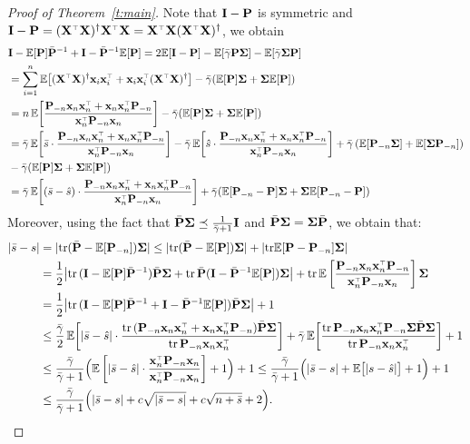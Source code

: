 \documentclass[11pt]{article}
\begin{document}
\begin{proof}[Proof of Theorem~\ref{t:main}]
Note that $\mathbf I - \mathbf P$ is symmetric and $\I-\P=(\X^\top\X)^\dagger\X^\top\X = \X^\top\X (\X^\top\X)^\dagger$, we obtain
\begin{align*}
  &\I - \E[\P]\bar\P^{-1} + \I - \bar\P^{-1} \E[\P]
  = 2\E[\I -\P] - \E[\bar\gamma\P\Sigmab] - \E[\bar\gamma\Sigmab\P]\\
  &= \sum_{i=1}^n\E\big[(\X^\top\X)^\dagger\x_i\x_i^\top + \x_i\x_i^\top (\X^\top\X)^\dagger \big] - \bar\gamma (\E[\P]\Sigmab + \Sigmab \E[\P])\\
  &=n\,\E\bigg[\frac{\P_{-n}\x_n\x_n^\top + \x_n\x_n^\top \P_{-n}}{\x_n^\top\P_{-n}\x_n}\bigg] - \bar\gamma (\E[\P]\Sigmab + \Sigmab \E[\P])\\
  &=\bar\gamma\,
    \E\bigg[\bar s\cdot\frac{\P_{-n}\x_n\x_n^\top + \x_n\x_n^\top \P_{-n}} {\x_n^\top\P_{-n}\x_n}\bigg]
    -\bar\gamma\,\E\bigg[\hat s
    \cdot\frac{\P_{-n}\x_n\x_n^\top + \x_n\x_n^\top \P_{-n}}{\x_n^\top\P_{-n}\x_n}\bigg] +
    \bar\gamma\,(\E[\P_{-n}\Sigmab] + \E[\Sigmab\P_{-n}]) \\ 
  &- \bar\gamma (\E[\P]\Sigmab + \Sigmab \E[\P]) \\
  &=\bar\gamma\,\E\bigg[(\bar s - \hat s)
    \cdot\frac{\P_{-n}\x_n\x_n^\top + \x_n\x_n^\top \P_{-n}}{\x_n^\top\P_{-n}\x_n}\bigg]
+    \bar\gamma (\E[\P_{-n}-\P]\Sigmab + \Sigmab \E[\P_{-n}-\P])
\end{align*}
Moreover, using the fact that $\bar{\mathbf P}\mathbf{\Sigma}\preceq\frac1{\bar\gamma+1}\mathbf I$ and $\bar {\mathbf P} \mathbf{\Sigma} = \mathbf{\Sigma} \bar {\mathbf P}$, we obtain that:
\begin{align*}
  |\bar s - s|   &= |\tr (\bar \P - \E[\P_{-n}] )\Sigmab|   \le |\tr (\bar \P - \E[\P] )\Sigmab|   + |\tr \E[\P - \P_{-n}] \Sigmab| \\
  &= \frac12 \big|\tr\,(\I-\E[\P]\bar\P^{-1})\bar\P\Sigmab + \tr\,\bar\P (\I - \bar \P^{-1} \E[\P]) \Sigmab \big|   + \tr\,\E \left[ \frac{\P_{-n}\x_n\x_n^\top\P_{-n}}{\x_n^\top \P_{-n} \x_n} \right] \Sigmab \\
  &= \frac12 \big|\tr\,(\I-\E[\P]\bar\P^{-1} + \I - \bar \P^{-1} \E[\P])\bar\P\Sigmab \big|   + 1 \\
  &\leq \frac{\bar\gamma}2 \,\E\bigg[|\bar s-\hat s|\cdot
    \frac{\tr\,(\P_{-n}\x_n\x_n^\top + \x_n\x_n^\top \P_{-n}) \bar\P\Sigmab}{\tr\,\P_{-n}\x_n\x_n^\top}  \bigg]
    + \bar\gamma\,
    \E\bigg[\frac{\tr\,\P_{-n}\x_n\x_n^\top\P_{-n}\Sigmab\bar\P\Sigmab}
    {\tr\,\P_{-n}\x_n\x_n^\top}\bigg] + 1\\
  &\leq \frac{\bar\gamma}{\bar\gamma+1}\Big(\E\left[|\bar s-\hat
    s| \cdot \frac{\x_n^\top \P_{-n} \x_n}{\x_n^\top \P_{-n} \x_n}  \right] + 1\Big) + 1\leq \frac{\bar\gamma}{\bar\gamma+1}\Big(|\bar
    s-s| + \E\big[|s-\hat s|\big] + 1\Big) + 1 \\
  &\leq \frac{\bar\gamma}{\bar\gamma+1}\Big(|\bar s- s| +
     c\sqrt{|\bar s- s|} + c\sqrt{n+\bar s} + 2\Big).
\end{align*}




\end{proof}
\end{document}
